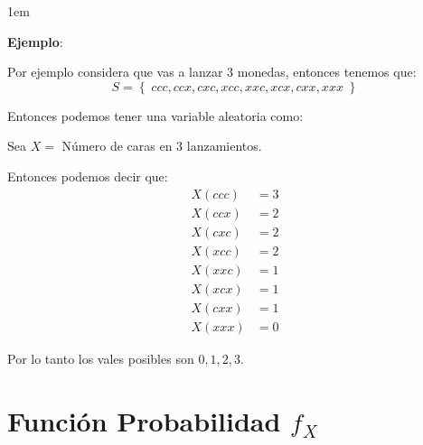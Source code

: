 \documentclass[12pt, fleqn]{report}                             %
\newenvironment{SmallIndentation}[1][0.75em]                    %
        {\begin{adjustwidth}{#1}{}\begin{footnotesize}}             %
        {\end{footnotesize}\end{adjustwidth}}                       %
\theoremstyle{break}                                            %
\newcommand{\Set}[1]            {\left\{ \; #1 \; \right\}}     %
\begin{document}
                \begin{SmallIndentation}[1em]
                    \textbf{Ejemplo}:
                    
                    Por ejemplo considera que vas a lanzar 3 monedas, entonces tenemos que:
                    \begin{equation*}
                        S = \Set{ccc, ccx, cxc, xcc, xxc, xcx, cxx, xxx}
                    \end{equation*}

                    Entonces podemos tener una variable aleatoria como:

                    Sea $X =$ Número de caras en 3 lanzamientos.

                    Entonces podemos decir que:
                    \begin{align*}
                        X(ccc) &= 3  \\
                        X(ccx) &= 2  \\
                        X(cxc) &= 2  \\
                        X(xcc) &= 2  \\
                        X(xxc) &= 1  \\
                        X(xcx) &= 1  \\
                        X(cxx) &= 1  \\
                        X(xxx) &= 0
                    \end{align*}

                    Por lo tanto los vales posibles son $0, 1, 2, 3$.

                \end{SmallIndentation}
                


        \clearpage
        \section{Función Probabilidad $f_X$}

           
\end{document}
